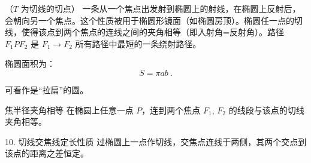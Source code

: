（$T$ 为切线的切点）
一条从一个焦点出发射到椭圆上的射线，在椭圆上反射后，会朝向另一个焦点。这个性质被用于椭圆形镜面（如椭圆房顶）。椭圆任一点的切线，使得该点到两个焦点的连线之间的夹角相等（即入射角=反射角）。路径 $F_1PF_2$ 是 $F_1 \to F_2$ 所有路径中最短的一条绕射路径。

椭圆面积为：
\begin{equation}
S = \pi a b~.
\end{equation}

可看作是“拉扁”的圆。

焦半径夹角相等
在椭圆上任意一点 $P$，连到两个焦点 $F_1$, $F_2$ 的线段与该点的切线夹角相等。

	10.	切线交焦线定长性质
过椭圆上一点作切线，交焦点连线于两侧，其两个交点到该点的距离之差恒定。







